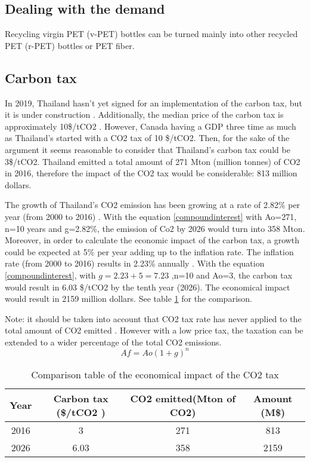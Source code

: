 \documentclass[twoside,a4paper,12pt]{report}
\begin{document}
\subsection{Dealing with the demand}
Recycling virgin PET (v-PET) bottles can be turned mainly into other recycled PET (r-PET) bottles or PET fiber. 


 \subsection{Carbon tax}
In 2019, Thailand hasn't yet signed for an implementation of the carbon tax, but it is under construction \cite{wbgcarbon2019}. Additionally, the median price of the carbon tax is approximately 10\$/tCO2 \cite{wbgcarbon2019}. However, Canada having a GDP three time as much as Thailand's \cite{worldbankgdp} started with a CO2 tax of 10 \$/tCO2. Then, for the sake of the argument it seems reasonable to consider that Thailand's carbon tax could be 3\$/tCO2. Thailand emitted a total amount of 271 Mton (million tonnes) of CO2 \cite{EDGARco22017} in 2016, therefore the impact of the CO2 tax would be considerable: 813 million dollars.

The growth of Thailand's CO2 emission has been growing at a rate of 2.82\% per year (from 2000 to 2016) \cite{wbgcarbon2019}. With the equation \ref{compoundinterest} with Ao=271, n=10 years and g=2.82\%, the emission of Co2 by 2026 would turn into 358  Mton. Moreover, in order to calculate the economic impact of the carbon tax, a growth could be expected at 5\% per year adding up to the inflation rate. The inflation rate (from 2000 to 2016) results in 2.23\% annually \cite{worldbankgdp}. With the equation \ref{compoundinterest}, with $g=2.23+5=7.23$ ,n=10 and Ao=3, the carbon tax would result in 6.03 \$/tCO2 by the tenth year (2026). The economical impact would result in 2159 million dollars. See table \ref{co2comparison} for the comparison. 

Note: it should be taken into account that CO2 tax rate has never applied to the total amount of CO2 emitted \cite{wbgcarbon2019}. However with a low price tax, the taxation can be extended to a wider percentage of the total CO2 emissions.
\begin{equation}
    Af=Ao(1+g)^n 
    \label{compoundinterest}
\end{equation}

\begin{table}
\centering
 \begin{tabular}{||c c c c||} 
 \hline
 Year & Carbon tax (\$/tCO2 ) & CO2 emitted(Mton of CO2) & Amount (M\$) \\ [0.5ex] 
 \hline\hline
 2016 & 3 & 271 & 813 \\ 
 \hline
 2026 & 6.03 & 358 & 2159 \\
 \hline
\end{tabular}
\label{co2comparison}
\caption{Comparison table of the economical impact of the CO2 tax}
\end{table}
\end{document}
